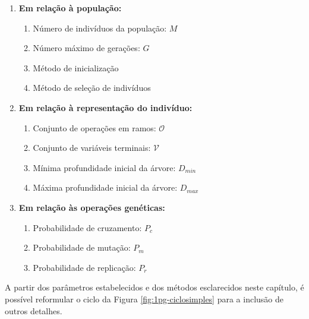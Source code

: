 \begin{enumerate}
\item \textbf{Em relação à população:}
\begin{enumerate}[label={\alph*)}]
\item Número de indivíduos da população: $M$
\item Número máximo de gerações: $G$
\item Método de inicialização
\item Método de seleção de indivíduos
\end{enumerate}
\item \textbf{Em relação à representação do indivíduo:}
\begin{enumerate}[label={\alph*)}]
\item Conjunto de operações em ramos: $\mathcal{O}$
\item Conjunto de variáveis terminais: $\mathcal{V}$
\item Mínima profundidade inicial da árvore: $D_{min}$
\item Máxima profundidade inicial da árvore: $D_{max}$
\end{enumerate}
\item \textbf{Em relação às operações genéticas:}
\begin{enumerate}[label={\alph*)}]
\item Probabilidade de cruzamento: $P_c$
\item Probabilidade de mutação: $P_m$
\item Probabilidade de replicação: $P_r$
\end{enumerate}
\end{enumerate}

A partir dos parâmetros estabelecidos e dos métodos esclarecidos neste capítulo, é possível reformular o ciclo da Figura \ref{fig:1pg-ciclosimples} para a inclusão de outros detalhes.

